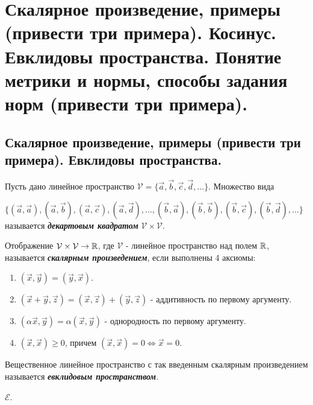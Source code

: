 \section{
    Скалярное произведение, примеры (привести три примера). Косинус. Евклидовы пространства. Понятие метрики и нормы, способы задания норм (привести три примера). 
}

\subsection{
    Скалярное произведение, примеры (привести три примера). Евклидовы пространства.
}

\begin{definition}
    Пусть дано линейное пространство $\mathcal{V} = \{\vec{a}, \vec{b}, \vec{c}, \vec{d}, \dots\}$. Множество вида 
    
    $\{(\vec{a}, \vec{a}), (\vec{a}, \vec{b}), (\vec{a}, \vec{c}), (\vec{a}, \vec{d}), \dots, (\vec{b}, \vec{a}), (\vec{b}, \vec{b}), (\vec{b}, \vec{c}), (\vec{b}, \vec{d}), \dots\}$ называется \textbf{\textit{декартовым квадратом}} $\mathcal{V} \times \mathcal{V}$.
\end{definition}

\begin{definition}
    Отображение $\mathcal{V} \times \mathcal{V} \to \mathbb{R}$, где $\mathcal{V}$ - линейное пространство над полем $\mathbb{R}$, называется \textbf{\textit{скалярным произведением}}, если выполнены 4 аксиомы:
    \begin{enumerate}[nosep]
        \item $(\vec{x}, \vec{y}) = (\vec{y}, \vec{x})$.
        \item $(\vec{x} + \vec{y}, \vec{z}) = (\vec{x}, \vec{z}) + (\vec{y}, \vec{z})$ - аддитивность по первому аргументу.
        \item $(\alpha \vec{x}, \vec{y}) = \alpha(\vec{x}, \vec{y})$ - однородность по первому аргументу.
        \item $(\vec{x}, \vec{x}) \geq 0$, причем $(\vec{x}, \vec{x}) = 0 \iff \vec{x} = 0$.
    \end{enumerate}
\end{definition}

\begin{definition}
    Вещественное линейное пространство с так введенным скалярным произведением называется \textbf{\textit{евклидовым пространством}}.
\end{definition}

\begin{designation}
    $\mathcal{E}$.
\end{designation}

